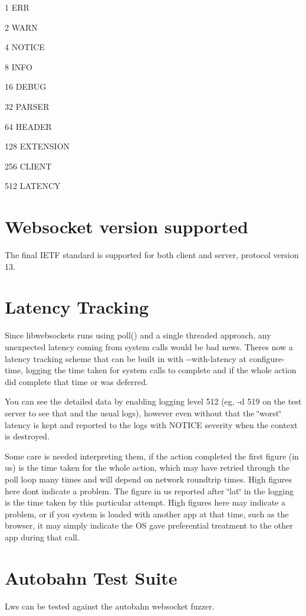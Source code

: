 \begin{DoxyItemize}
\item 1 E\+RR
\item 2 W\+A\+RN
\item 4 N\+O\+T\+I\+CE
\item 8 I\+N\+FO
\item 16 D\+E\+B\+UG
\item 32 P\+A\+R\+S\+ER
\item 64 H\+E\+A\+D\+ER
\item 128 E\+X\+T\+E\+N\+S\+I\+ON
\item 256 C\+L\+I\+E\+NT
\item 512 L\+A\+T\+E\+N\+CY
\end{DoxyItemize}\hypertarget{md_README.test-apps_ws13}{}\section{Websocket version supported}\label{md_README.test-apps_ws13}
The final I\+E\+TF standard is supported for both client and server, protocol version 13.\hypertarget{md_README.test-apps_latency}{}\section{Latency Tracking}\label{md_README.test-apps_latency}
Since libwebsockets runs using {\ttfamily poll()} and a single threaded approach, any unexpected latency coming from system calls would be bad news. There\textquotesingle{}s now a latency tracking scheme that can be built in with {\ttfamily -\/-\/with-\/latency} at configure-\/time, logging the time taken for system calls to complete and if the whole action did complete that time or was deferred.

You can see the detailed data by enabling logging level 512 (eg, {\ttfamily -\/d 519} on the test server to see that and the usual logs), however even without that the \char`\"{}worst\char`\"{} latency is kept and reported to the logs with N\+O\+T\+I\+CE severity when the context is destroyed.

Some care is needed interpreting them, if the action completed the first figure (in us) is the time taken for the whole action, which may have retried through the poll loop many times and will depend on network roundtrip times. High figures here don\textquotesingle{}t indicate a problem. The figure in us reported after \char`\"{}lat\char`\"{} in the logging is the time taken by this particular attempt. High figures here may indicate a problem, or if you system is loaded with another app at that time, such as the browser, it may simply indicate the OS gave preferential treatment to the other app during that call.\hypertarget{md_README.test-apps_autobahn}{}\section{Autobahn Test Suite}\label{md_README.test-apps_autobahn}
Lws can be tested against the autobahn websocket fuzzer.

